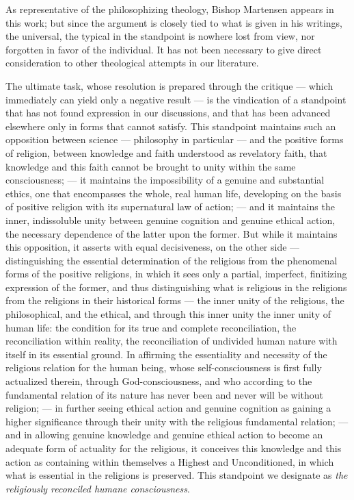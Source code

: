 \documentclass[12pt,a4paper]{article}
\begin{document}
As representative of the philosophizing theology, Bishop Martensen
appears in this work; but since the argument is closely tied to what
is given in his writings, the universal, the typical in the standpoint
is nowhere lost from view, nor forgotten in favor of the individual.
It has not been necessary to give direct consideration to other
theological attempts in our literature.

The ultimate task, whose resolution is prepared through the critique
--- which immediately can yield only a negative result --- is the
vindication of a standpoint that has not found expression in our
discussions, and that has been advanced elsewhere only in forms that
cannot satisfy. This standpoint maintains such an opposition between
science --- philosophy in particular --- and the positive forms of
religion, between knowledge and faith understood as revelatory faith,
that knowledge and this faith cannot be brought to unity within the
same consciousness; --- it maintains the impossibility of a genuine
and substantial ethics, one that encompasses the whole, real human
life, developing on the basis of positive religion with its
supernatural law of action; --- and it maintains the inner,
indissoluble unity between genuine cognition and genuine ethical
action, the necessary dependence of the latter upon the former. But
while it maintains this opposition, it asserts with equal
decisiveness, on the other side --- distinguishing the essential
determination of the religious from the phenomenal forms of the
positive religions, in which it sees only a partial, imperfect,
finitizing expression of the former, and thus distinguishing what is
religious in the religions from the religions in their historical
forms --- the inner unity of the religious, the philosophical, and the
ethical, and through this inner unity the inner unity of human life:
the condition for its true and complete reconciliation, the
reconciliation within reality, the reconciliation of undivided human
nature with itself in its essential ground. In affirming the
essentiality and necessity of the religious relation for the human
being, whose self-consciousness is first fully actualized therein,
through God-consciousness, and who according to the fundamental
relation of its nature has never been and never will be without
religion; --- in further seeing ethical action and genuine cognition as
gaining a higher significance through their unity with the religious
fundamental relation; --- and in allowing genuine knowledge and genuine
ethical action to become an adequate form of actuality for the
religious, it conceives this knowledge and this action as containing
within themselves a Highest and Unconditioned, in which what is
essential in the religions is preserved. This standpoint we designate
as \textit{the religiously reconciled humane consciousness}.
\end{document}

